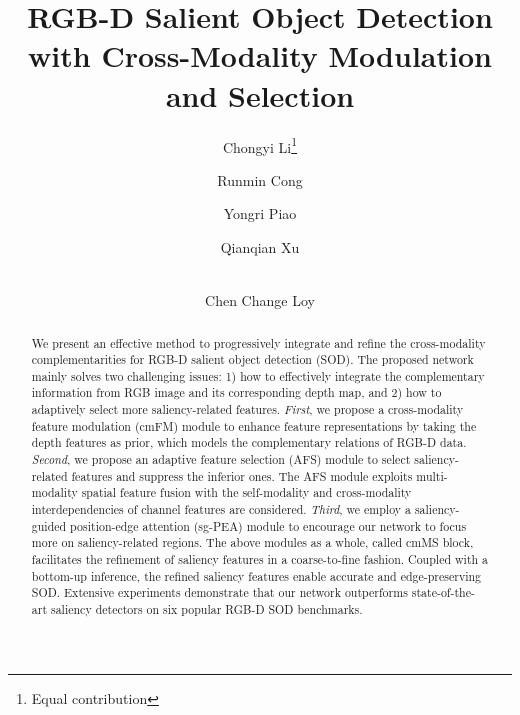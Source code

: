 \documentclass[runningheads]{llncs}
\makeatletter
\newcommand{\etal}{\textit{et al}.}
\newcommand{\printfnsymbol}[1]{\textsuperscript{\@fnsymbol{#1}}}
\makeatother
\begin{document}
\title{RGB-D Salient Object Detection with Cross-Modality Modulation and Selection} 

\author{Chongyi Li\thanks{Equal contribution}\and
		Runmin Cong\printfnsymbol{1}\textsuperscript{\Letter} \and
		Yongri Piao \and
		Qianqian Xu \and \\
		Chen Change Loy}
\authorrunning{Li \etal}


\maketitle              


\begin{abstract}
We present an effective method to progressively integrate and refine the cross-modality complementarities for RGB-D salient object detection (SOD).
The proposed network mainly solves two challenging issues: 1) how to effectively integrate the complementary information from RGB image and its corresponding depth map, and 2) how to adaptively select more saliency-related features.
\textit{First}, we propose a cross-modality feature modulation (cmFM) module  to enhance feature representations by taking the depth features as prior, which models the complementary relations of RGB-D data.
\textit{Second}, we propose an adaptive feature selection (AFS)  module to  select saliency-related features and suppress the inferior ones. The AFS module exploits multi-modality spatial feature fusion with the self-modality and cross-modality interdependencies of channel features are considered.
\textit{Third}, we employ a saliency-guided position-edge attention (sg-PEA) module to encourage our network to focus more on saliency-related regions.
The above modules as a whole, called cmMS block, facilitates the refinement of saliency features in a coarse-to-fine fashion.
Coupled with a bottom-up inference, the refined saliency features enable accurate and edge-preserving SOD.
Extensive experiments demonstrate that our network outperforms state-of-the-art saliency detectors on six popular RGB-D SOD benchmarks.
\end{abstract}
\end{document}
